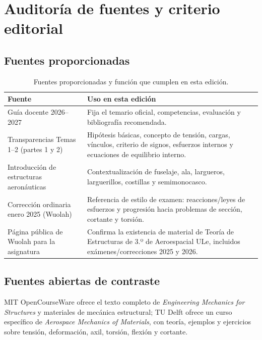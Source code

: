 \chapter{Auditoría de fuentes y criterio editorial}

\section{Fuentes proporcionadas}
\begin{longtable}{p{}p{}}
\caption{Fuentes proporcionadas y función que cumplen en esta edición.}
\label{tab:auditoria-fuentes}\\
\toprule
\textbf{Fuente} & \textbf{Uso en esta edición}\\
\midrule\endhead
Guía docente 2026--2027 & Fija el temario oficial, competencias, evaluación y bibliografía recomendada.\autocite{ule-guia-2026}\\
Transparencias Temas 1--2 (partes 1 y 2) & Hipótesis básicas, concepto de tensión, cargas, vínculos, criterio de signos, esfuerzos internos y ecuaciones de equilibrio interno.\autocite{lanza-temas12a,lanza-temas12b}\\
Introducción de estructuras aeronáuticas & Contextualización de fuselaje, ala, largueros, larguerillos, costillas y semimonocasco.\autocite{ule-estructuras-intro}\\
Corrección ordinaria enero 2025 (Wuolah) & Referencia de estilo de examen: reacciones/leyes de esfuerzos y progresión hacia problemas de sección, cortante y torsión.\autocite{wuolah-examen-2025}\\
Página pública de Wuolah para la asignatura & Confirma la existencia de material de Teoría de Estructuras de 3.º de Aeroespacial ULe, incluidos exámenes/correcciones 2025 y 2026.\autocite{wuolah-ule-page}\\
\bottomrule
\end{longtable}

\section{Fuentes abiertas de contraste}
MIT OpenCourseWare ofrece el texto completo de \textit{Engineering Mechanics for Structures} y materiales de mecánica estructural; TU Delft ofrece un curso específico de \textit{Aerospace Mechanics of Materials}, con teoría, ejemplos y ejercicios sobre tensión, deformación, axil, torsión, flexión y cortante.\autocite{bucciarelli2002,tudelft-mom,mit-structural-mechanics,mit-analysis-design}

